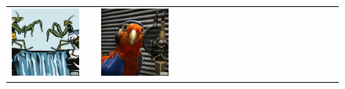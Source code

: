 \begin{figure}[ht!]
\begin{adjustwidth}{-0.8in}{-0.5in}
\begin{tabular}{cccccccccccccccccccc}
\multicolumn{2}{c}{\includegraphics[width=\threebythreecolwidth\textwidth]{figures/cherries/mantis_2.jpg}} &&
\multicolumn{2}{c}{\includegraphics[width=\threebythreecolwidth\textwidth]{figures/cherries/bird_sing7.jpg}} &

\end{tabular}
\end{adjustwidth}
\end{figure}
